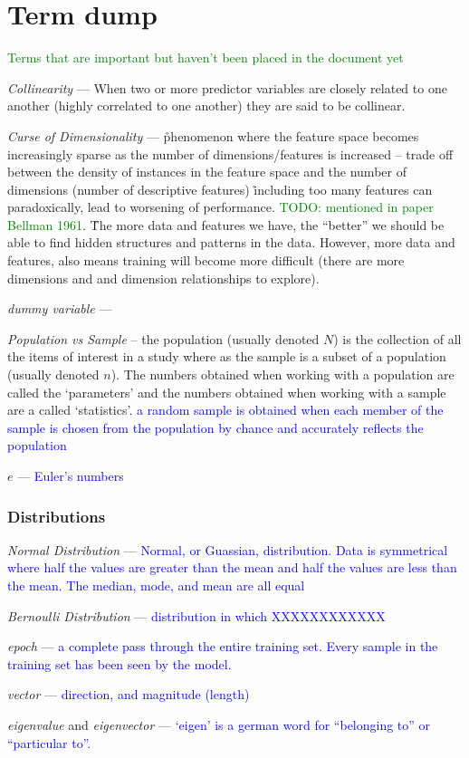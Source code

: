 \chapter{Term dump}

\textcolor{green}{Terms that are important but haven't been placed in the document yet}

\emph{Collinearity} --- When two or more predictor variables are closely related to one another (highly correlated to one another) they are said to be collinear.

\emph{Curse of Dimensionality} --- \r{phenomenon where the feature space becomes increasingly sparse as the number of dimensions/features is increased -- trade off between the density of instances in the feature space and the number of dimensions (number of descriptive features) \r{including too many features can paradoxically, lead to worsening of performance.} \textcolor{green}{TODO: mentioned in paper Bellman 1961}}. \r{The more data and features we have, the ``better'' we should be able to find hidden structures and patterns in the data. However, more data and features, also means training will become more difficult (there are more dimensions and and dimension relationships to explore).}

\emph{dummy variable} ---


\emph{Population vs Sample} -- the population (usually denoted $N$) is the collection of all the items of interest in a study where as the sample is a subset of a population (usually denoted $n$). The numbers obtained when working with a population are called the `parameters' and the numbers obtained when working with a sample are a called `statistics'. \textcolor{blue}{a random sample is obtained when each member of the sample is chosen from the population by chance and accurately reflects the population}

\emph{$e$} --- \textcolor{blue}{Euler's numbers}

\subsection{Distributions}

\emph{Normal Distribution} --- \textcolor{blue}{Normal, or Guassian, distribution. Data is symmetrical where half the values are greater than the mean and half the values are less than the mean. The median, mode, and mean are all equal}

\emph{Bernoulli Distribution} --- \textcolor{blue}{distribution in which XXXXXXXXXXXX}

\emph{epoch} --- \textcolor{blue}{a complete pass through the entire training set. Every sample in the training set has been seen by the model.} 

\emph{vector} --- \textcolor{blue}{direction, and magnitude (length)}

\emph{eigenvalue} and \emph{eigenvector} --- \textcolor{blue}{`eigen' is a german word for ``belonging to'' or ``particular to''.} 